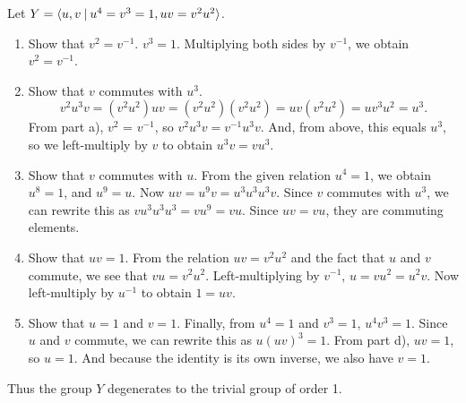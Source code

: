 \documentclass{article}
\begin{document}
Let $Y = \langle u, v \hspace{0.5ex}|\hspace{0.5ex} u^4 = v^3 = 1, uv = v^2 u^2 \rangle$.

\begin{enumerate}[label=(\alph*)]
    \item Show that $v^2 = v^{-1}$.
          $v^3 = 1$. Multiplying both sides by $v^{-1}$, we obtain $v^2 = v^{-1}$.
    \item Show that $v$ commutes with $u^3$.
          \begin{equation*}
            v^2 u^3 v = (v^2 u^2) uv = (v^2 u^2)(v^2 u^2) = uv(v^2 u^2) = uv^3 u^2 = u^3.
          \end{equation*}
          From part a), $v^2$ = $v^{-1}$, so $v^2 u^3 v = v^{-1} u^3 v$. And, from above, this equals $u^3$, so we left-multiply by $v$ to obtain $u^3 v = v u^3$.
    \item Show that $v$ commutes with $u$.
          From the given relation $u^4 = 1$, we obtain $u^8 = 1$, and $u^9 = u$. Now $uv = u^9 v = u^3 u^3 u^3 v$. Since $v$ commutes with $u^3$, we can rewrite this as $v u^3 u^3 u^3 = v u^9 = vu$. Since $uv = vu$, they are commuting elements.
    \item Show that $uv = 1$.
          From the relation $uv = v^2 u^2$ and the fact that $u$ and $v$ commute, we see that $vu = v^2 u^2$. Left-multiplying by $v^{-1}$, $u = v u^2 = u^2 v$. Now left-multiply by $u^{-1}$ to obtain $1 = uv$.
    \item Show that $u = 1$ and $v = 1$.
          Finally, from $u^4 = 1$ and $v^3 = 1$, $u^4 v^3 = 1$. Since $u$ and $v$ commute, we can rewrite this as $u(uv)^3 = 1$. From part d), $uv = 1$, so $u = 1$. And because the identity is its own inverse, we also have $v = 1$.
\end{enumerate}

Thus the group $Y$ degenerates to the trivial group of order 1.
\end{document}
